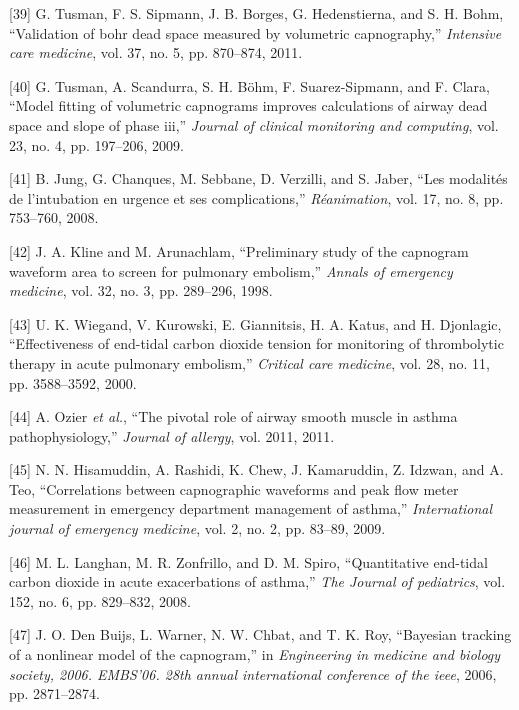 \documentclass[12pt,]{article}
\begin{document}
\leavevmode\hypertarget{ref-tusman2011validation}{}%
{[}39{]} G. Tusman, F. S. Sipmann, J. B. Borges, G. Hedenstierna, and S.
H. Bohm, ``Validation of bohr dead space measured by volumetric
capnography,'' \emph{Intensive care medicine}, vol. 37, no. 5, pp.
870--874, 2011.

\leavevmode\hypertarget{ref-tusman2009model}{}%
{[}40{]} G. Tusman, A. Scandurra, S. H. Böhm, F. Suarez-Sipmann, and F.
Clara, ``Model fitting of volumetric capnograms improves calculations of
airway dead space and slope of phase iii,'' \emph{Journal of clinical
monitoring and computing}, vol. 23, no. 4, pp. 197--206, 2009.

\leavevmode\hypertarget{ref-jung2008modalites}{}%
{[}41{]} B. Jung, G. Chanques, M. Sebbane, D. Verzilli, and S. Jaber,
``Les modalités de l'intubation en urgence et ses complications,''
\emph{Réanimation}, vol. 17, no. 8, pp. 753--760, 2008.

\leavevmode\hypertarget{ref-kline1998preliminary}{}%
{[}42{]} J. A. Kline and M. Arunachlam, ``Preliminary study of the
capnogram waveform area to screen for pulmonary embolism,'' \emph{Annals
of emergency medicine}, vol. 32, no. 3, pp. 289--296, 1998.

\leavevmode\hypertarget{ref-wiegand2000effectiveness}{}%
{[}43{]} U. K. Wiegand, V. Kurowski, E. Giannitsis, H. A. Katus, and H.
Djonlagic, ``Effectiveness of end-tidal carbon dioxide tension for
monitoring of thrombolytic therapy in acute pulmonary embolism,''
\emph{Critical care medicine}, vol. 28, no. 11, pp. 3588--3592, 2000.

\leavevmode\hypertarget{ref-ozier2011pivotal}{}%
{[}44{]} A. Ozier \emph{et al.}, ``The pivotal role of airway smooth
muscle in asthma pathophysiology,'' \emph{Journal of allergy}, vol.
2011, 2011.

\leavevmode\hypertarget{ref-hisamuddin2009correlations}{}%
{[}45{]} N. N. Hisamuddin, A. Rashidi, K. Chew, J. Kamaruddin, Z.
Idzwan, and A. Teo, ``Correlations between capnographic waveforms and
peak flow meter measurement in emergency department management of
asthma,'' \emph{International journal of emergency medicine}, vol. 2,
no. 2, pp. 83--89, 2009.

\leavevmode\hypertarget{ref-langhan2008quantitative}{}%
{[}46{]} M. L. Langhan, M. R. Zonfrillo, and D. M. Spiro, ``Quantitative
end-tidal carbon dioxide in acute exacerbations of asthma,'' \emph{The
Journal of pediatrics}, vol. 152, no. 6, pp. 829--832, 2008.

\leavevmode\hypertarget{ref-den2006bayesian}{}%
{[}47{]} J. O. Den Buijs, L. Warner, N. W. Chbat, and T. K. Roy,
``Bayesian tracking of a nonlinear model of the capnogram,'' in
\emph{Engineering in medicine and biology society, 2006. EMBS'06. 28th
annual international conference of the ieee}, 2006, pp. 2871--2874.
\end{document}
